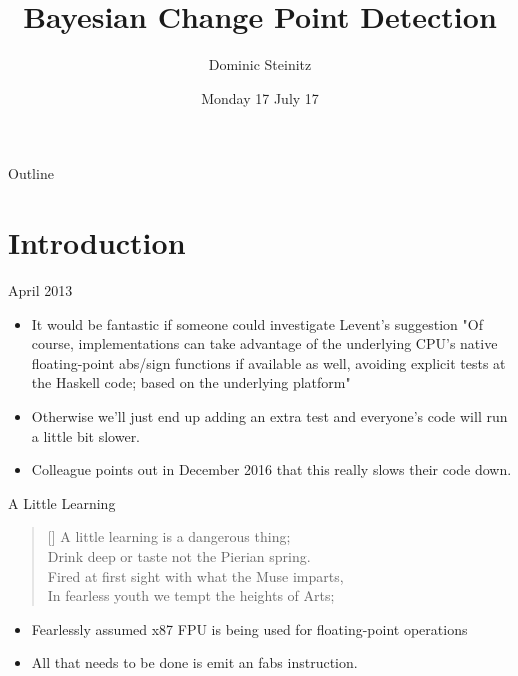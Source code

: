 \documentclass[presentation]{beamer}
\author{Dominic Steinitz}
\date{Monday 17 July 17}
\title{Bayesian Change Point Detection}
\begin{document}
\maketitle
\begin{frame}{Outline}
\tableofcontents
\end{frame}


\section{Introduction}

\begin{frame}{April 2013}

  \begin{itemize}
    \item
        It would be fantastic if someone could
        investigate Levent's suggestion "Of course,
        implementations can take advantage of the
        underlying CPU's native floating-point
        abs/sign functions if available as well,
        avoiding explicit tests at the Haskell code;
        based on the underlying platform"
      \item
        Otherwise we'll just end up adding an extra test
        and everyone's code will run a little bit slower.
      \item Colleague points out in December 2016
        that this really slows their code down.
    \end{itemize}

\end{frame}

\begin{frame}{A Little Learning}

  \settowidth{\versewidth}{Fired at first sight with what the Muse imparts,}
  \begin{verse}[\versewidth]
    A little learning is a dangerous thing; \\
    Drink deep or taste not the Pierian spring. \\
    Fired at first sight with what the Muse imparts, \\
    In fearless youth we tempt the heights of Arts;
  \end{verse}

  \begin{itemize}
    \item
      Fearlessly assumed x87 FPU is being used for
      floating-point operations
    \item All that needs to be done is emit an
      fabs instruction.
    \end{itemize}

\end{frame}
\end{document}
